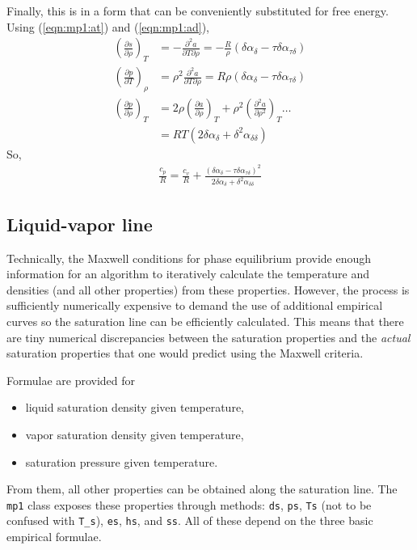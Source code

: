 Finally, this is in a form that can be conveniently substituted for free energy.  Using (\ref{eqn:mp1:at}) and (\ref{eqn:mp1:ad}),
\begin{align*}
\left(\frac{\partial s}{\partial \rho}\right)_T &= - \frac{\partial^2 a}{\partial T \partial \rho} = - \frac{R}{\rho}\left( \delta \alpha_\delta - \tau \delta \alpha_{\tau\delta} \right)\\
\left(\frac{\partial p}{\partial T}\right)_\rho &= \rho^2 \frac{\partial^2 a}{\partial T \partial \rho} = R \rho \left( \delta \alpha_\delta - \tau \delta \alpha_{\tau\delta} \right)\\
\left(\frac{\partial p}{\partial \rho}\right)_T &= 2 \rho \left(\frac{\partial a}{\partial \rho}\right)_T + \rho^2 \left(\frac{\partial^2 a}{\partial \rho^2}\right)_T \ldots\\
 &= RT \left( 2\delta \alpha_\delta + \delta^2 \alpha_{\delta\delta} \right)
\end{align*}
So, 
\begin{align}
\frac{c_p}{R} = \frac{c_v}{R} + \frac{\left(\delta \alpha_\delta - \tau \delta \alpha_{\tau\delta} \right)^2}{2\delta \alpha_\delta + \delta^2\alpha_{\delta\delta}}
\end{align}

\subsection{Liquid-vapor line}

Technically, the Maxwell conditions for phase equilibrium provide enough information for an algorithm to iteratively calculate the temperature and densities (and all other properties) from these properties.  However, the process is sufficiently numerically expensive to demand the use of additional empirical curves so the saturation line can be efficiently calculated.  This means that there are tiny numerical discrepancies between the saturation properties and the \emph{actual} saturation properties that one would predict using the Maxwell criteria.  

Formulae are provided for
\begin{itemize}
\item liquid saturation density given temperature,
\item vapor saturation density given temperature,
\item saturation pressure given temperature.
\end{itemize}
From them, all other properties can be obtained along the saturation line.  The \texttt{mp1} class exposes these properties through methods: \texttt{ds}, \texttt{ps}, \texttt{Ts} (not to be confused with \verb|T_s|), \texttt{es}, \texttt{hs}, and \texttt{ss}.  All of these depend on the three basic empirical formulae.

